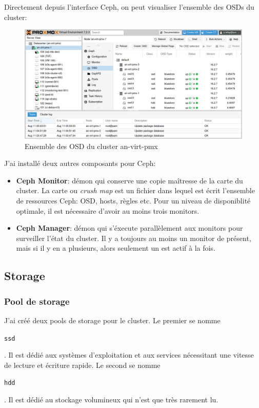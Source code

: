 \documentclass[12pt, a4paper, twoside]{article}
\begin{document}
Directement depuis l'interface \gls{Ceph}, on peut visualiser l'ensemble des \gls{OSD}s du \gls{cluster}:
\begin{figure}[ht!]
    \centering
        \includegraphics[width=\textwidth]{src/interface_proxmox_osd.png}
    \caption{Ensemble des \gls{OSD} du \gls{cluster} an-virt-pmx}
    \label{fig:osd_cluster}
\end{figure}

\newpage
J'ai installé deux autres composants pour \gls{Ceph}:
\begin{itemize}
    \item \textbf{\gls{Ceph} Monitor}: démon qui conserve une copie maîtresse de la carte du \gls{cluster}. 
    La carte ou \textit{crush map} est un fichier dans lequel est écrit l'ensemble de ressources \gls{Ceph}: \gls{OSD}, hosts, règles etc.
    Pour un niveau de disponiblité optimale, il est nécessaire d'avoir au moins trois monitors.
    \item \textbf{\gls{Ceph} Manager}: démon qui s'éxecute parallèlement aux monitors pour surveiller l'état du \gls{cluster}.
    Il y a toujours au moins un monitor de présent, mais si il y en a plusieurs, alors seulement un est actif à la fois.
\end{itemize}

\subsection{Storage}
\subsubsection{Pool de storage}
J'ai créé deux pools de storage pour le \gls{cluster}.
Le premier se nomme \begin{code}\texttt{ssd}\end{code}. 
Il est dédié aux systèmes d'exploitation et aux services nécessitant une vitesse de lecture et écriture rapide.
Le second se nomme \begin{code}\texttt{hdd}\end{code}.
Il est dédié au stockage volumineux qui n'est que très rarement lu.
\end{document}
